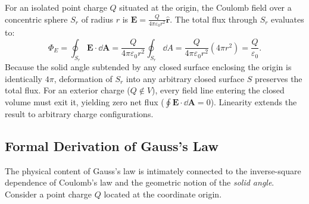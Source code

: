 \begin{proofbox}
For an isolated point charge $Q$ situated at the origin, the Coulomb field over a concentric sphere $S_r$ of radius $r$ is $\bm{E} = \frac{Q}{4\pi\varepsilon_0 r^2} \hat{\bm{r}}$. The total flux through $S_r$ evaluates to:
\begin{equation}
    \Phi_E = \oint_{S_r} \bm{E} \cdot \dd\bm{A} = \frac{Q}{4\pi\varepsilon_0 r^2} \oint_{S_r} \dd A = \frac{Q}{4\pi\varepsilon_0 r^2} (4\pi r^2) = \frac{Q}{\varepsilon_0}.
\end{equation}
Because the solid angle subtended by any closed surface enclosing the origin is identically $4\pi$, deformation of $S_r$ into any arbitrary closed surface $S$ preserves the total flux. For an exterior charge ($Q \notin V$), every field line entering the closed volume must exit it, yielding zero net flux ($\oint \bm{E} \cdot \dd\bm{A} = 0$). Linearity extends the result to arbitrary charge configurations.
\end{proofbox}

\subsection{Formal Derivation of Gauss's Law}

The physical content of Gauss's law is intimately connected to the inverse-square dependence of Coulomb's law and the geometric notion of the \emph{solid angle}. Consider a point charge $Q$ located at the coordinate origin.

